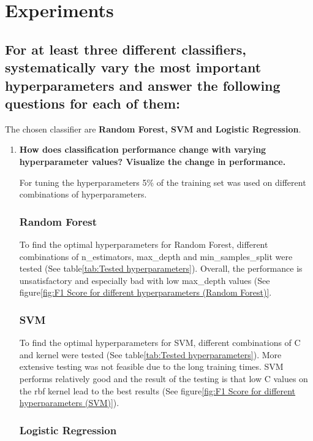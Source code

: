 
\section{Experiments}
\label{sec:Experiments}






\subsection{For at least three different classifiers, systematically vary the most important hyperparameters and answer the following questions for each of them: }
\label{sec:Experiments:a}

The chosen classifier are \textbf{Random Forest, SVM and Logistic Regression}.

\begin{enumerate}[label=\roman*.)]
\item \textbf{How does classification performance change with varying hyperparameter values? Visualize the
change in performance.}

For tuning the hyperparameters 5\% of the training set was used on different combinations of hyperparameters.

\subsubsection*{Random Forest}
To find the optimal hyperparameters for Random Forest, different combinations of n\_estimators, max\_depth and min\_samples\_split were tested (See table\ref{tab:Tested hyperparameters}). Overall, the performance is  unsatisfactory and especially bad with low max\_depth values (See figure\ref{fig:F1 Score for different hyperparameters (Random Forest)}.

\subsubsection*{SVM}
To find the optimal hyperparameters for SVM, different combinations of C and kernel  were tested (See table\ref{tab:Tested hyperparameters}). More extensive testing was not feasible due to the long training times. SVM performs relatively good and the result of the testing is that low C values on the rbf kernel lead to the best results (See figure\ref{fig:F1 Score for different hyperparameters (SVM)}).


\subsubsection*{Logistic Regression}


\end{enumerate}
